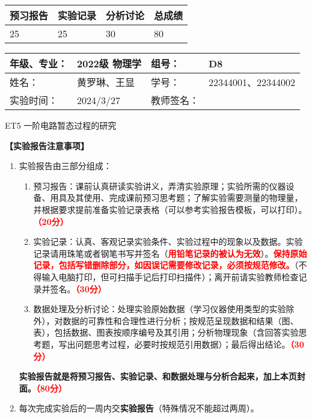 \documentclass[dvipsnames, svgnames,a4paper,11pt]{article}
\begin{document}
	
	\begin{table}
		\renewcommand\arraystretch{1.7}
		\begin{tabularx}{\textwidth}{
				|X|X|X|X
				|X|X|X|X|}
			\hline
			\multicolumn{2}{|c|}{预习报告}&\multicolumn{2}{|c|}{实验记录}&\multicolumn{2}{|c|}{分析讨论}&\multicolumn{2}{|c|}{总成绩}\\
			\hline
			\LARGE25 & & \LARGE25 & & \LARGE30 & & \LARGE80 & \\
			\hline
		\end{tabularx}
	\end{table}
	
	\begin{table}
		\renewcommand\arraystretch{1.7}
		\begin{tabularx}{\textwidth}{|X|X|X|X|}
			\hline
			年级、专业： & 2022级 物理学 &组号： &D8 \\
			\hline
			姓名： &  黄罗琳、王显  & 学号： &22344001、22344002   \\
			\hline
			实验时间： & 2024/3/27 & 教师签名： & \\
			\hline
		\end{tabularx}
	\end{table}
	
	\begin{center}
		\LARGE ET5 \quad 一阶电路暂态过程的研究
	\end{center}
	
	
	\textbf{【实验报告注意事项】}
	\begin{enumerate}
		\item 实验报告由三部分组成：
		\begin{enumerate}
			\item 预习报告：课前认真研读实验讲义，弄清实验原理；实验所需的仪器设备、用具及其使用、完成课前预习思考题；了解实验需要测量的物理量，并根据要求提前准备实验记录表格（可以参考实验报告模板，可以打印）。\textcolor{red}{\textbf{（20分）}}
			\item 实验记录：认真、客观记录实验条件、实验过程中的现象以及数据。实验记录请用珠笔或者钢笔书写并签名（\textcolor{red}{\textbf{用铅笔记录的被认为无效}}）。\textcolor{red}{\textbf{保持原始记录，包括写错删除部分，如因误记需要修改记录，必须按规范修改。}}（不得输入电脑打印，但可扫描手记后打印扫描件）；离开前请实验教师检查记录并签名。\textcolor{red}{\textbf{（30分）}}
			\item 数据处理及分析讨论：处理实验原始数据（学习仪器使用类型的实验除外），对数据的可靠性和合理性进行分析；按规范呈现数据和结果（图、表），包括数据、图表按顺序编号及其引用；分析物理现象（含回答实验思考题，写出问题思考过程，必要时按规范引用数据）；最后得出结论。\textcolor{red}{\textbf{（30分）}}
		\end{enumerate}
		\textbf{实验报告就是将预习报告、实验记录、和数据处理与分析合起来，加上本页封面。\textcolor{red}{（80分）}}
		\item 每次完成实验后的一周内交\textbf{实验报告}（特殊情况不能超过两周）。
		
	\end{enumerate}
	
\end{document}
